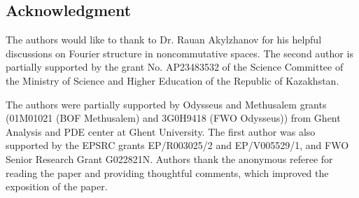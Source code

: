 \documentclass[a4paper,12pt]{amsart}
\numberwithin{equation}{section}
\theoremstyle{definition}
\begin{document}

\subsection*{Acknowledgment}
The authors would like to thank to Dr. Rauan Akylzhanov for his helpful discussions on Fourier structure in noncommutative spaces. The second author is partially supported by the grant No. AP23483532 of the Science Committee of the Ministry of Science and Higher Education of the Republic of Kazakhstan.

The authors were partially supported by Odysseus and Methusalem grants (01M01021 (BOF Methusalem) and 3G0H9418 (FWO Odysseus)) from Ghent Analysis and PDE center at Ghent University. The first author was also supported by the EPSRC grants EP/R003025/2 and EP/V005529/1, and FWO Senior Research
Grant G022821N.
Authors thank the anonymous referee for reading the paper and providing thoughtful comments, which improved the exposition of the paper.
\end{document}
